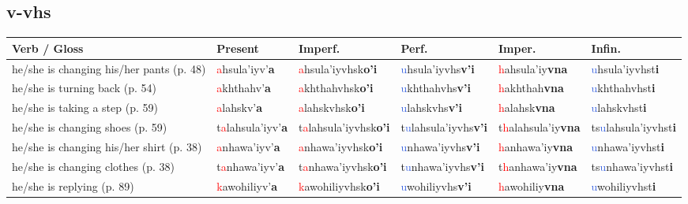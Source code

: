 \documentclass[oneside,openany]{book}%
\begin{document}
\subsection*{v-vhs}%
\begin{tabularx}{\textwidth}{>{\hsize=1.5\hsize\RaggedRight}X >{\hsize=0.9\hsize}X >{\hsize=0.9\hsize}X >{\hsize=0.9\hsize}X >{\hsize=0.9\hsize}X >{\hsize=0.9\hsize}X}%
\toprule%
\textbf{Verb / Gloss}&\textbf{Present}&\textbf{Imperf.}&\textbf{Perf.}&\textbf{Imper.}&\textbf{Infin.}\\%
\midrule%
he/she is changing his/her pants (p. 48)&\textcolor{Red}{a}hsula'iyv'\textbf{a}&\textcolor{Red}{a}hsula'iyvhsk\textbf{o'i}&\textcolor{RoyalBlue}{u}hsula'iyvhs\textbf{v'i}&\textcolor{Red}{h}ahsula'iy\textbf{vna}&\textcolor{RoyalBlue}{u}hsula'iyvhst\textbf{i}\\%
he/she is turning back (p. 54)&\textcolor{Red}{a}khthahv'\textbf{a}&\textcolor{Red}{a}khthahvhsk\textbf{o'i}&\textcolor{RoyalBlue}{u}khthahvhs\textbf{v'i}&\textcolor{Red}{h}akhthah\textbf{vna}&\textcolor{RoyalBlue}{u}khthahvhst\textbf{i}\\%
he/she is taking a step (p. 59)&\textcolor{Red}{a}lahskv'\textbf{a}&\textcolor{Red}{a}lahskvhsk\textbf{o'i}&\textcolor{RoyalBlue}{u}lahskvhs\textbf{v'i}&\textcolor{Red}{h}alahsk\textbf{vna}&\textcolor{RoyalBlue}{u}lahskvhst\textbf{i}\\%
he/she is changing shoes (p. 59)&t\textcolor{Red}{a}lahsula'iyv'\textbf{a}&t\textcolor{Red}{a}lahsula'iyvhsk\textbf{o'i}&t\textcolor{RoyalBlue}{u}lahsula'iyvhs\textbf{v'i}&t\textcolor{Red}{h}alahsula'iy\textbf{vna}&ts\textcolor{RoyalBlue}{u}lahsula'iyvhst\textbf{i}\\%
he/she is changing his/her shirt (p. 38)&\textcolor{Red}{a}nhawa'iyv'\textbf{a}&\textcolor{Red}{a}nhawa'iyvhsk\textbf{o'i}&\textcolor{RoyalBlue}{u}nhawa'iyvhs\textbf{v'i}&\textcolor{Red}{h}anhawa'iy\textbf{vna}&\textcolor{RoyalBlue}{u}nhawa'iyvhst\textbf{i}\\%
he/she is changing clothes (p. 38)&t\textcolor{Red}{a}nhawa'iyv'\textbf{a}&t\textcolor{Red}{a}nhawa'iyvhsk\textbf{o'i}&t\textcolor{RoyalBlue}{u}nhawa'iyvhs\textbf{v'i}&t\textcolor{Red}{h}anhawa'iy\textbf{vna}&ts\textcolor{RoyalBlue}{u}nhawa'iyvhst\textbf{i}\\%
he/she is replying (p. 89)&\textcolor{Red}{k}awohiliyv'\textbf{a}&\textcolor{Red}{k}awohiliyvhsk\textbf{o'i}&\textcolor{RoyalBlue}{u}wohiliyvhs\textbf{v'i}&\textcolor{Red}{h}awohiliy\textbf{vna}&\textcolor{RoyalBlue}{u}wohiliyvhst\textbf{i}\\%

\end{tabularx}
\end{document}
